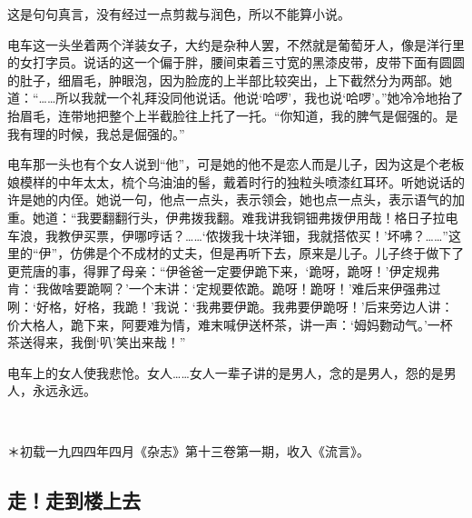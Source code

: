 \par 这是句句真言，没有经过一点剪裁与润色，所以不能算小说。
\par 电车这一头坐着两个洋装女子，大约是杂种人罢，不然就是葡萄牙人，像是洋行里的女打字员。说话的这一个偏于胖，腰间束着三寸宽的黑漆皮带，皮带下面有圆圆的肚子，细眉毛，肿眼泡，因为脸庞的上半部比较突出，上下截然分为两部。她道：“……所以我就一个礼拜没同他说话。他说‘哈啰’，我也说‘哈啰’。”她冷冷地抬了抬眉毛，连带地把整个上半截脸往上托了一托。“你知道，我的脾气是倔强的。是我有理的时候，我总是倔强的。”
\par 电车那一头也有个女人说到“他”，可是她的他不是恋人而是儿子，因为这是个老板娘模样的中年太太，梳个乌油油的髻，戴着时行的独粒头喷漆红耳环。听她说话的许是她的内侄。她说一句，他点一点头，表示领会，她也点一点头，表示语气的加重。她道：“我要翻翻行头，伊弗拨我翻。难我讲我铜钿弗拨伊用哉！格日子拉电车浪，我教伊买票，伊哪哼话？……‘侬拨我十块洋钿，我就搭侬买！’坏咈？……”这里的“伊”，仿佛是个不成材的丈夫，但是再听下去，原来是儿子。儿子终于做下了更荒唐的事，得罪了母亲：“伊爸爸一定要伊跪下来，‘跪呀，跪呀！’伊定规弗肯：‘我做啥要跪啊？’一个末讲：‘定规要侬跪。跪呀！跪呀！’难后来伊强弗过咧：‘好格，好格，我跪！’我说：‘我弗要伊跪。我弗要伊跪呀！’后来旁边人讲：价大格人，跪下来，阿要难为情，难末喊伊送杯茶，讲一声：‘姆妈覅动气。’一杯茶送得来，我倒‘叭’笑出来哉！”
\par 电车上的女人使我悲怆。女人……女人一辈子讲的是男人，念的是男人，怨的是男人，永远永远。
\par  
\par ＊初载一九四四年四月《杂志》第十三卷第一期，收入《流言》。


\subsection{走！走到楼上去}

